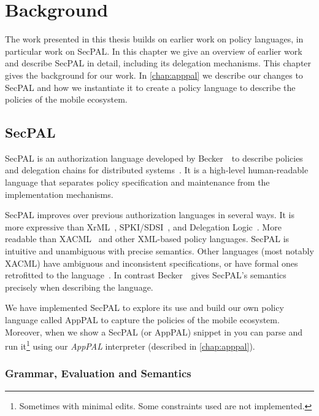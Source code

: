 \documentclass[thesis.tex]{subfiles}
\begin{document}
\chapter{Background}

The work presented in this thesis builds on earlier work on policy languages, in
particular work on SecPAL. In this chapter we give an overview of earlier work
and describe SecPAL in detail, including its delegation mechanisms. This chapter
gives the background for our work. In \autoref{chap:apppal} we describe our
changes to SecPAL and how we instantiate it to create a policy language to
describe the policies of the mobile ecosystem.

\section{SecPAL}

SecPAL is an authorization language developed by Becker~\etal~to
describe policies and delegation chains for distributed
systems~\cite{becker_secpal:_2006}. It is a high-level
human-readable language that separates policy specification and
maintenance from the implementation mechanisms.

SecPAL improves over previous authorization languages in several
ways. It is more expressive than
XrML~\cite{kolovski_logic-based_2007}, SPKI/SDSI~\cite{ellison_spki_1999}, and
Delegation Logic~\cite{li_delegation_2003}. More readable than
XACML~\cite{oasis_extensible_2013} and other XML-based policy languages.
SecPAL is intuitive and unambiguous with precise
semantics. Other languages (most notably XACML) have ambiguous and inconsistent specifications, or have
formal ones retrofitted to the language~\cite{bryans_reasoning_2005,ramli_logic_2014,masi_formalisation_2012}.
In contrast Becker~\etal~gives SecPAL's semantics precisely when describing the language.

We have implemented SecPAL to explore its use and build our own policy language called AppPAL to capture the policies
of the mobile ecosystem. Moreover, when we show a SecPAL (or AppPAL)
snippet in  you can parse
and run it\footnote{Sometimes with minimal edits. Some constraints used are not
implemented.} using our \emph{AppPAL} interpreter (described in \autoref{chap:apppal}).

\subsection{Grammar, Evaluation and Semantics}
\end{document}
